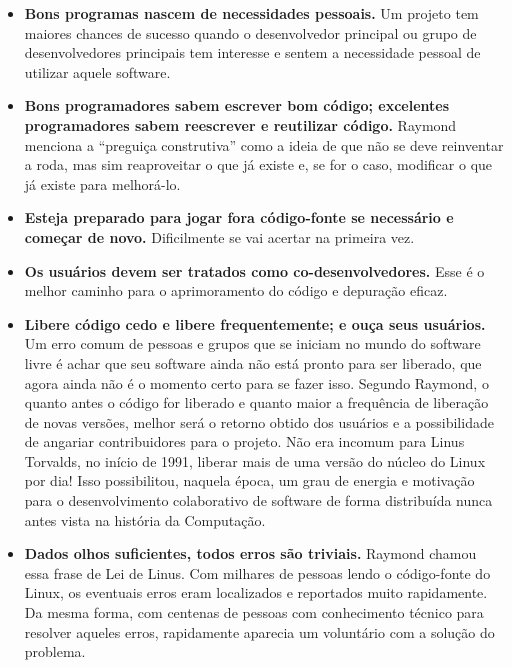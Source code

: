 \begin{itemize}

\item \textbf{Bons programas nascem de necessidades pessoais.} Um projeto tem maiores chances de sucesso
    quando o desenvolvedor principal ou grupo de desenvolvedores principais tem interesse e sentem
    a necessidade pessoal de utilizar aquele software.

\item \textbf{Bons programadores sabem escrever bom código; excelentes
    programadores sabem reescrever e reutilizar código.} Raymond menciona a ``preguiça construtiva''
    como a ideia de que não se deve reinventar a roda, mas sim reaproveitar o que já existe e,
    se for o caso, modificar o que já existe para melhorá-lo.

\item \textbf{Esteja preparado para jogar fora código-fonte se necessário e começar de novo.} 
  Dificilmente se vai acertar na primeira vez.
  
\item \textbf{Os usuários devem ser tratados como co-desenvolvedores.} Esse é o melhor caminho para 
    o aprimoramento do código e depuração eficaz.
    
\item \textbf{Libere código cedo e libere frequentemente; e ouça seus usuários.} 
  Um erro comum de pessoas e grupos que se 
  iniciam no mundo do software livre é achar que seu software ainda não está pronto para ser
  liberado, que agora ainda não é o momento certo para se fazer isso. Segundo Raymond, o quanto
  antes o código for liberado e quanto maior a frequência de liberação de novas versões, melhor
  será o retorno obtido dos usuários e a possibilidade de angariar contribuidores para o projeto.
  Não era incomum para Linus Torvalds, no início de 1991, liberar mais de uma versão do núcleo
  do Linux por dia! Isso possibilitou, naquela época, um grau de energia e motivação para o
  desenvolvimento colaborativo de software de forma distribuída nunca antes vista na história da 
  Computação.
  
\item \textbf{Dados olhos suficientes, todos erros são triviais.} Raymond chamou essa frase de Lei de Linus.
    Com milhares de pessoas lendo o código-fonte do Linux, os eventuais erros eram localizados e
    reportados muito rapidamente. Da mesma forma, com centenas de pessoas com conhecimento técnico
    para resolver aqueles erros, rapidamente aparecia um voluntário com a solução do problema.


\end{itemize}
